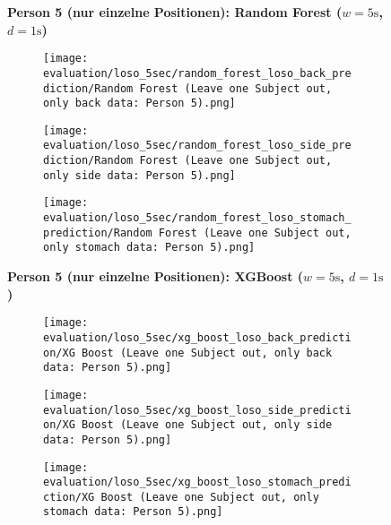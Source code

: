 \begin{figure}
    \textbf{Person 5 (nur einzelne Positionen): Random Forest ($w=5\si{\s}$, $d=1\si{\s}$)}
      \centering
      \begin{subfigure}{1\textwidth}
          \texttt{[image: evaluation/loso\_5sec/random\_forest\_loso\_back\_prediction/Random Forest (Leave one Subject out, only back data: Person 5).png]}
        \end{subfigure}
        \begin{subfigure}{1\textwidth}
          \texttt{[image: evaluation/loso\_5sec/random\_forest\_loso\_side\_prediction/Random Forest (Leave one Subject out, only side data: Person 5).png]}
        \end{subfigure}
        \begin{subfigure}{1\textwidth}
          \texttt{[image: evaluation/loso\_5sec/random\_forest\_loso\_stomach\_prediction/Random Forest (Leave one Subject out, only stomach data: Person 5).png]}
      \end{subfigure}
        \textbf{Person 5 (nur einzelne Positionen): XGBoost ($w=5\si{\s}$, $d=1\si{\s}$)}
      \centering
      \begin{subfigure}{1\textwidth}
          \texttt{[image: evaluation/loso\_5sec/xg\_boost\_loso\_back\_prediction/XG Boost (Leave one Subject out, only back data: Person 5).png]}
        \end{subfigure}
        \begin{subfigure}{1\textwidth}
            \texttt{[image: evaluation/loso\_5sec/xg\_boost\_loso\_side\_prediction/XG Boost (Leave one Subject out, only side data: Person 5).png]}
        \end{subfigure}
        \begin{subfigure}{1\textwidth}
            \texttt{[image: evaluation/loso\_5sec/xg\_boost\_loso\_stomach\_prediction/XG Boost (Leave one Subject out, only stomach data: Person 5).png]}
      \end{subfigure}
  
      \label{evaluation:random_forest:person5}
\end{figure}
